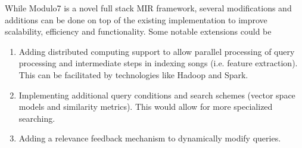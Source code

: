 \documentclass{article}
\begin{document}
\noindent While Modulo7 is a novel full stack MIR framework, several modifications and additions can be done on top of the existing implementation to improve scalability, efficiency and functionality. Some notable extensions could be 

\begin{enumerate}
\item Adding distributed computing support to allow parallel processing of query processing and intermediate steps in indexing songs (i.e. feature extraction). This can be facilitated by technologies like Hadoop and Spark.
\item Implementing additional query conditions and search schemes (vector space models and similarity metrics). This would allow for more specialized searching. 
\item Adding a relevance feedback mechanism to dynamically modify queries. 
\end{enumerate}


\end{document}

